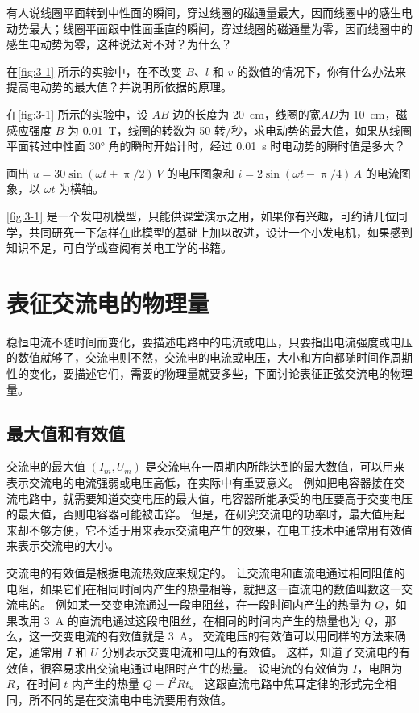 \begin{Practice}
\begin{question}
  \item 有人说线圈平面转到中性面的瞬间，穿过线圈的磁通量最大，因而线圈中的感生电动势最大；线圈平面跟中性面垂直的瞬间，穿过线圈的磁通量为零，因而线圈中的感生电动势为零，这种说法对不对？为什么？
  \item 在\cref{fig:3-1} 所示的实验中，在不改变 $B$、$l$ 和 $v$ 的数值的情况下，你有什么办法来提高电动势的最大值？并说明所依据的原理。
  \item 在\cref{fig:3-1} 所示的实验中，设 $AB$ 边的长度为 \qty{20}{cm}，线圈的宽$AD$为 \qty{10}{cm}，磁感应强度 $B$ 为 \qty{0.01}{T}，线圈的转数为 50 转/秒，求电动势的最大值，如果从线圈平面转过中性面 \ang{30} 角的瞬时开始计时，经过 \qty{0.01}{s} 时电动势的瞬时值是多大？
  \item 画出 $u=30\sin(\omega t+\uppi/2)\,\unit{V}$ 的电压图象和 $i=2\sin(\omega t-\uppi/4) \,\unit{A}$ 的电流图象，以 $\omega t$ 为横轴。
  \item \cref{fig:3-1} 是一个发电机模型，只能供课堂演示之用，如果你有兴趣，可约请几位同学，共同研究一下怎样在此模型的基础上加以改进，设计一个小发电机，如果感到知识不足，可自学或查阅有关电工学的书籍。
\end{question}
\end{Practice}


\section{表征交流电的物理量}
稳恒电流不随时间而变化，要描述电路中的电流或电压，只要指出电流强度或电压的数值就够了，交流电则不然，交流电的电流或电压，大小和方向都随时间作周期性的变化，要描述它们，需要的物理量就要多些，下面讨论表征正弦交流电的物理量。

\subsection{最大值和有效值}
交流电的最大值 $(I_m,U_m)$ 是交流电在一周期内所能达到的最大数值，可以用来表示交流电的电流强弱或电压高低，在实际中有重要意义。
例如把电容器接在交流电路中，就需要知道交变电压的最大值，电容器所能承受的电压要高于交变电压的最大值，否则电容器可能被击穿。
但是，在研究交流电的功率时，最大值用起来却不够方便，它不适于用来表示交流电产生的效果，在电工技术中通常用有效值来表示交流电的大小。

交流电的有效值是根据电流热效应来规定的。
让交流电和直流电通过相同阻值的电阻，如果它们在相同时间内产生的热量相等，就把这一直流电的数值叫数这一交流电的。
例如某一交变电流通过一段电阻丝，在一段时间内产生的热量为 $Q$，如果改用 \qty{3}{A} 的直流电通过这段电阻丝，在相同的时间内产生的热量也为 $Q$，那么，这一交变电流的有效值就是 \qty{3}{A}。
交流电压的有效值可以用同样的方法来确定，通常用 $I$ 和 $U$ 分别表示交变电流和电压的有效值。
这样，知道了交流电的有效值，很容易求出交流电通过电阻时产生的热量。
设电流的有效值为 $I$，电阻为 $R$，在时间 $t$ 内产生的热量 $Q=I^2Rt$。
这跟直流电路中焦耳定律的形式完全相同，所不同的是在交流电中电流要用有效值。

